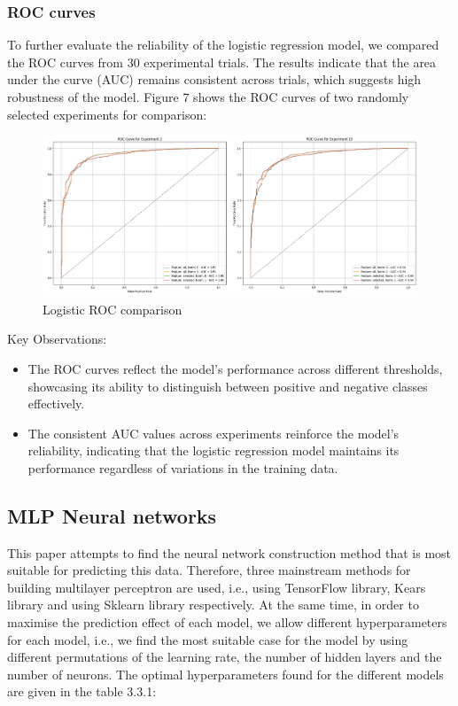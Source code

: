 \documentclass[conference]{IEEEtran}
\begin{document}
\subsubsection{ROC curves }

To further evaluate the reliability of the logistic regression model, we compared the ROC curves from 30 experimental trials. The results indicate that the area under the curve (AUC) remains consistent across trials, which suggests high robustness of the model. Figure 7 shows the ROC curves of two randomly selected experiments for comparison:
\begin{figure}[h]
    \centering
    \includegraphics[width=\textwidth]{roc_comp.png} %
    \caption{Logistic ROC comparison}
    \label{fig:example1_image}
\end{figure}

Key Observations:
\begin{itemize}
\item The ROC curves reflect the model’s performance across different thresholds, showcasing its ability to distinguish between positive and negative classes effectively.
\item The consistent AUC values across experiments reinforce the model’s reliability, indicating that the logistic regression model maintains its performance regardless of variations in the training data.
\end{itemize}




\subsection{MLP Neural networks}

This paper attempts to find the neural network construction method that is most suitable for predicting this data. Therefore, three mainstream methods for building multilayer perceptron are used, i.e., using TensorFlow library, Kears library and using Sklearn library respectively. At the same time, in order to maximise the prediction effect of each model, we allow different hyperparameters for each model, i.e., we find the most suitable case for the model by using different permutations of the learning rate, the number of hidden layers and the number of neurons. The optimal hyperparameters found for the different models are given in the table 3.3.1:
\end{document}
